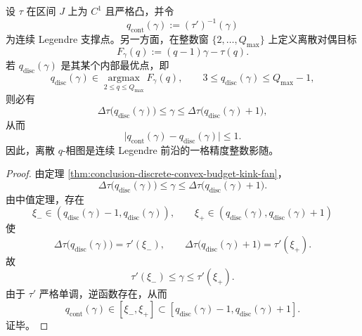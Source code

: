 \begin{theorem}\label{thm:conclusion-continuous-legendre-support-one-cell-shadowing}
设 \(\tau\) 在区间 \(J\) 上为 \(C^1\) 且严格凸，并令
\[
q_{\mathrm{cont}}(\gamma):=(\tau')^{-1}(\gamma)
\]
为连续 Legendre 支撑点。另一方面，在整数窗 \(\{2,\dots,Q_{\max}\}\) 上定义离散对偶目标
\[
F_\gamma(q):=(q-1)\gamma-\tau(q).
\]
若 \(q_{\mathrm{disc}}(\gamma)\) 是其某个内部最优点，即
\[
q_{\mathrm{disc}}(\gamma)\in \operatorname*{argmax}_{2\le q\le Q_{\max}}F_\gamma(q),
\qquad
3\le q_{\mathrm{disc}}(\gamma)\le Q_{\max}-1,
\]
则必有
\[
\Delta\tau\bigl(q_{\mathrm{disc}}(\gamma)\bigr)
\le \gamma \le
\Delta\tau\bigl(q_{\mathrm{disc}}(\gamma)+1\bigr),
\]
从而
\[
\bigl|q_{\mathrm{cont}}(\gamma)-q_{\mathrm{disc}}(\gamma)\bigr|\le 1.
\]
因此，离散 \(q\)-相图是连续 Legendre 前沿的一格精度整数影随。
\end{theorem}
\begin{proof}
由定理 \ref{thm:conclusion-discrete-convex-budget-kink-fan}，
\[
\Delta\tau\bigl(q_{\mathrm{disc}}(\gamma)\bigr)
\le \gamma \le
\Delta\tau\bigl(q_{\mathrm{disc}}(\gamma)+1\bigr).
\]
由中值定理，存在
\[
\xi_-\in(q_{\mathrm{disc}}(\gamma)-1,q_{\mathrm{disc}}(\gamma)),
\qquad
\xi_+\in(q_{\mathrm{disc}}(\gamma),q_{\mathrm{disc}}(\gamma)+1)
\]
使
\[
\Delta\tau\bigl(q_{\mathrm{disc}}(\gamma)\bigr)=\tau'(\xi_-),
\qquad
\Delta\tau\bigl(q_{\mathrm{disc}}(\gamma)+1\bigr)=\tau'(\xi_+).
\]
故
\[
\tau'(\xi_-)\le \gamma\le \tau'(\xi_+).
\]
由于 \(\tau'\) 严格单调，逆函数存在，从而
\[
q_{\mathrm{cont}}(\gamma)\in[\xi_-,\xi_+]
\subset
[q_{\mathrm{disc}}(\gamma)-1,q_{\mathrm{disc}}(\gamma)+1].
\]
证毕。
\end{proof}

